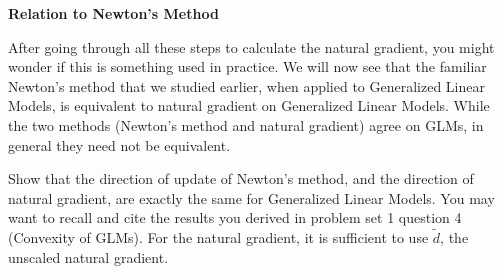 \item {} \textbf{Relation to Newton's Method}

After going through all these steps to calculate the natural gradient, you might wonder if this is something used in practice. We will now see that the familiar Newton's method that we studied earlier, when applied to Generalized Linear Models, is equivalent to natural gradient on Generalized Linear Models. While the two methods (Newton's method and natural gradient) agree on GLMs, in general they need not be equivalent.

Show that the direction of update of Newton's method, and the direction of natural gradient, are exactly the same for Generalized Linear Models. You may want to recall and cite the results you derived in problem set 1 question 4 (Convexity of GLMs). For the natural gradient, it is sufficient to use $\tilde{d}$, the unscaled natural gradient.

